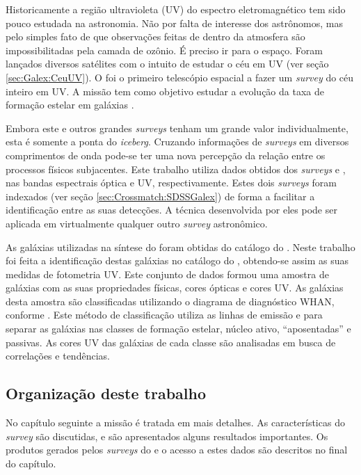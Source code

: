 Historicamente a região ultravioleta (UV) do espectro eletromagnético tem sido
pouco estudada na astronomia. Não por falta de interesse dos astrônomos, mas
pelo simples fato de que observações feitas de dentro da atmosfera são
impossibilitadas pela camada de ozônio. É preciso ir para o espaço. Foram
lançados diversos satélites com o intuito de estudar o céu em UV (ver seção
\ref{sec:Galex:CeuUV}). O \galex foi o primeiro telescópio espacial a fazer um
{\em survey} do céu inteiro em UV. A missão tem como objetivo estudar a evolução
da taxa de formação estelar em galáxias \citep{Martin2005}.

Embora este e outros grandes {\em surveys} tenham um grande valor
individualmente, esta é somente a ponta do {\em iceberg}. Cruzando informações
de {\em surveys} em diversos comprimentos de onda pode-se ter uma nova percepção
da relação entre os processos físicos subjacentes. Este trabalho utiliza dados
obtidos dos {\em surveys} \SDSS e \galex, nas bandas espectrais óptica e UV,
respectivamente. Estes dois {\em surveys} foram indexados (ver seção
\ref{sec:Crossmatch:SDSSGalex}) de forma a facilitar a identificação entre as
suas detecções. A técnica desenvolvida por eles pode ser aplicada em
virtualmente qualquer outro {\em survey} astronômico.

As galáxias utilizadas na síntese do \starlight foram obtidas do catálogo do
\SDSS. Neste trabalho foi feita a identificação destas galáxias no catálogo do
\galex, obtendo-se assim as suas medidas de fotometria UV. Este conjunto de
dados formou uma amostra de galáxias com as suas propriedades físicas, cores
ópticas e cores UV. As galáxias desta amostra são classificadas utilizando o
diagrama de diagnóstico WHAN, conforme \citet{CidFernandes2011}. Este método de
classificação utiliza as linhas de emissão \Halpha e \NII para separar as
galáxias nas classes de formação estelar, núcleo ativo, ``aposentadas'' e
passivas. As cores UV das galáxias de cada classe são analisadas em busca de
correlações e tendências.

\subsection{Organização deste trabalho}

No capítulo seguinte a missão \galex é tratada em mais detalhes. As
características do {\em survey} são discutidas, e são apresentados alguns
resultados importantes. Os produtos gerados pelos {\em surveys} do \galex e o
acesso a estes dados são descritos no final do capítulo.

